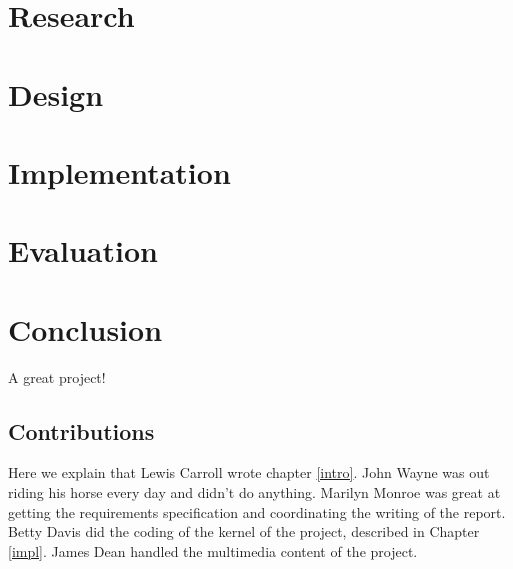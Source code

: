 \documentclass{l3proj}
\begin{document}
\chapter{Research}
\label{research}




\chapter{Design}
\label{design}



\chapter{Implementation}
\label{implementation}



\chapter{Evaluation}
\label{evaluation}


\chapter{Conclusion}
\label{conclusion}

A great project!

\section{Contributions}
\label{contributions}

Here we explain that Lewis Carroll wrote chapter \ref{intro}. John Wayne
was out riding his horse every day and didn't do anything. Marilyn Monroe
was great at getting the requirements specification and coordinating the
writing of the report. Betty Davis did the coding of the kernel of the
project, described in Chapter \ref{impl}.  James Dean handled the
multimedia content of the project.



\end{document}
